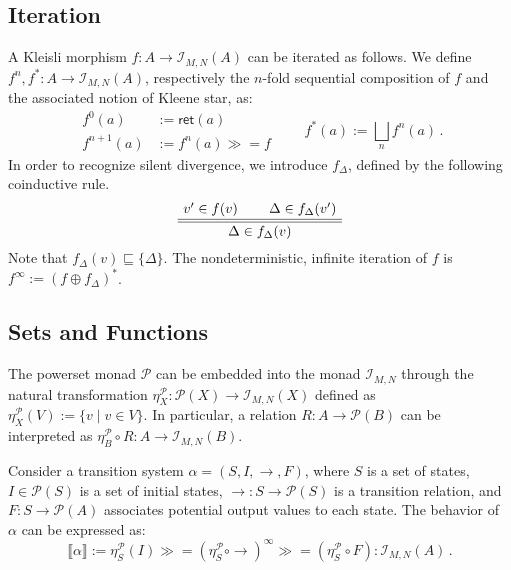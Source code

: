 \documentclass[acmsmall,timestamp,review,anonymous]{acmart}
\newcommand{\kw}[1]{\ensuremath{ \mathsf{#1} }}
\newcommand{\bind}{\gg\!\!=}
\begin{document}

\subsection{Iteration} \label{sec:monad:iter} %


A Kleisli morphism $f : A \rightarrow \mathcal{I}_{M,N}(A)$
can be iterated as follows.
We define
$f^n, f^* : A \rightarrow \mathcal{I}_{M,N}(A)$,
respectively the $n$-fold sequential composition of $f$
and the associated notion of Kleene star, as:
\[
  \begin{array}{rl}
    f^0(a) &:= \kw{ret}(a) \\
    f^{n+1}(a) &:= f^n(a) \bind f
  \end{array}
  \qquad
  f^*(a) := \bigsqcup_n f^n(a) \,.
\]
In order to recognize silent divergence,
we introduce $f_\Delta$,
defined by the following coinductive rule.
\[
    \AxiomC{$v' \in f(v)$}
    \AxiomC{$\Delta \in f_\Delta(v')$}
    \doubleLine
    \BinaryInfC{$\Delta \in f_\Delta(v)$}
    \DisplayProof
\]
Note that $f_\Delta(v) \sqsubseteq \{\Delta\}$.
The nondeterministic, infinite iteration of $f$ is
$f^\infty := (f \oplus f_\Delta)^*$.


\subsection{Sets and Functions} \label{sec:monad:powerset} %

The powerset monad $\mathcal{P}$
can be embedded into the monad $\mathcal{I}_{M,N}$
through the natural transformation
$\eta^\mathcal{P}_X : \mathcal{P}(X) \rightarrow \mathcal{I}_{M,N}(X)$
defined as
$\eta^\mathcal{P}_X(V) := \{ v \mid v \in V \}$.
In particular,
a relation $R : A \rightarrow \mathcal{P}(B)$
can be interpreted as
$\eta^\mathcal{P}_B \circ R : A \rightarrow \mathcal{I}_{M,N}(B)$.

\begin{example} \label{ex:ts} %
Consider a transition system $\alpha = (S, I, {\rightarrow}, F)$,
where
$S$ is a set of states,
$I \in \mathcal{P}(S)$
is a set of initial states,
${\rightarrow} : S \rightarrow \mathcal{P}(S)$
is a transition relation, and
$F : S \rightarrow \mathcal{P}(A)$
associates potential output values to each state.
The behavior of $\alpha$ can be expressed as:
\[
    \llbracket \alpha \rrbracket :=
    \eta^\mathcal{P}_S(I) \bind
    (\eta^\mathcal{P}_S \circ {\rightarrow})^\infty \bind
    (\eta^\mathcal{P}_S \circ F)
    : \mathcal{I}_{M,N}(A) \,.
\]
\end{example}
\end{document}
